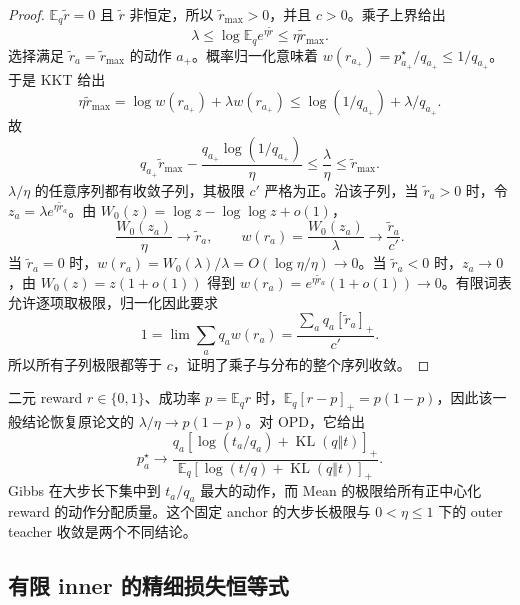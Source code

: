 \documentclass[lang=cn,scheme=chinese,openany]{../book/elegantbook}
\newcommand{\E}{\mathbb E}
\newcommand{\KL}{\operatorname{KL}}
\begin{document}
\begin{proof}
$\E_q\widetilde r=0$ 且  $\widetilde r$ 非恒定，所以 $\widetilde r_{\max}>0$，并且 $c>0$。乘子上界给出
\begin{equation*}
 \lambda\le\log\E_qe^{\eta\widetilde r}\le\eta \widetilde r_{\max}.
\end{equation*}
选择满足 $\widetilde r_a=\widetilde r_{\max}$ 的动作 $a_+$。概率归一化意味着 $w(r_{a_+})=p_{a_+}^\star/q_{a_+}\le1/q_{a_+}$。于是 KKT 给出
\begin{equation*}
 \eta \widetilde r_{\max}
 =\log w(r_{a_+})+\lambda w(r_{a_+})
 \le\log(1/q_{a_+})+\lambda/q_{a_+}.
\end{equation*}
故
\begin{equation*}
 q_{a_+}\widetilde r_{\max}-\frac{q_{a_+}\log(1/q_{a_+})}{\eta}
 \le\frac{\lambda}{\eta}\le \widetilde r_{\max}.
\end{equation*}
$\lambda/\eta$ 的任意序列都有收敛子列，其极限 $c'$ 严格为正。沿该子列，当 $\widetilde r_a>0$ 时，令 $z_a=\lambda e^{\eta \widetilde r_a}$。由 $W_0(z)=\log z-\log\log z+o(1)$，
\begin{equation*}
 \frac{W_0(z_a)}{\eta}\to \widetilde r_a,
 \qquad w(r_a)=\frac{W_0(z_a)}{\lambda}\to\frac{\widetilde r_a}{c'}.
\end{equation*}
当 $\widetilde r_a=0$ 时，$w(r_a)=W_0(\lambda)/\lambda=O(\log\eta/\eta)\to0$。当 $\widetilde r_a<0$ 时，$z_a\to0$，由 $W_0(z)=z(1+o(1))$ 得到 $w(r_a)=e^{\eta \widetilde r_a}(1+o(1))\to0$。有限词表允许逐项取极限，归一化因此要求
\begin{equation*}
 1=\lim\sum_aq_aw(r_a)=\frac{\sum_aq_a[\widetilde r_a]_+}{c'}.
\end{equation*}
所以所有子列极限都等于 $c$，证明了乘子与分布的整个序列收敛。
\end{proof}

二元 reward $r\in\{0,1\}$、成功率 $p=\E_qr$ 时，$\E_q[r-p]_+=p(1-p)$，因此该一般结论恢复原论文的 $\lambda/\eta\to p(1-p)$。对 OPD，它给出
\begin{equation*}
 p_a^\star\longrightarrow
 \frac{q_a[\log(t_a/q_a)+\KL(q\Vert t)]_+}
 {\E_q[\log(t/q)+\KL(q\Vert t)]_+}.
\end{equation*}
Gibbs 在大步长下集中到 $t_a/q_a$ 最大的动作，而 Mean 的极限给所有正中心化 reward 的动作分配质量。这个固定 anchor 的大步长极限与 $0<\eta\le1$ 下的 outer teacher 收敛是两个不同结论。

\subsection{有限 inner 的精细损失恒等式}
\end{document}
